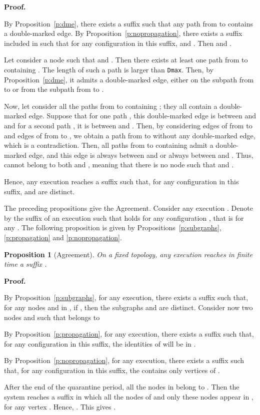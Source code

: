 \documentclass[11pt,english]{article}
\newtheorem{proposition}{Proposition}
\newenvironment{proof}[1][0cm]{
  \begin{list}{\bf Proof.~}{
      \setlength{\itemindent}{0cm}
      \setlength{\labelsep}{0cm}
      \setlength{\labelwidth}{#1}
      \setlength{\leftmargin}{#1}
    \item
    }
}{\hfill
  \end{list}
}
\begin{document}
\begin{proof}
  By Proposition~\ref{p:dme}, there exists a suffix  such that any path
  from  to  contains a double-marked edge. By
  Proposition~\ref{p:nopropagation}, there exists a suffix  included in
   such that for any configuration  in this suffix,  and . Then  and
  .

  Let consider a node  such that  and . Then there
  exists at least one path from  to  containing . The length of such a
  path is larger than \texttt{Dmax}. Then, by Proposition~\ref{p:dme}, it
  admits a double-marked edge, either on the subpath from  to  or from the
  subpath from  to .

  Now, let consider all the paths from  to  containing ; they all
  contain a double-marked edge. Suppose that for one path , this double-marked edge is between  and  and for a second path , it is between
   and . Then, by considering edges of  from  to  and edges of
   from  to , we obtain a path from  to  without any double-marked edge, which is a contradiction. Then, all paths from  to 
  containing  admit a double-marked edge, and this edge is always between 
  and  or always between  and . Thus,  cannot belong to both 
  and , meaning that there is no node  such that  and .

  Hence, any execution reaches a suffix such that, for any configuration  in
  this suffix,  and  are distinct.
\end{proof} 



The preceding propositions give the Agreement.  Consider any execution
.  Denote by  the suffix of an execution
 such that  holds for any configuration ,
that is  for any .
The following proposition is given by Propositions~\ref{p:subgraphs},
\ref{p:propagation} and \ref{p:nopropagation}.

\begin{proposition}[Agreement]\label{p:agree}
  On a fixed topology, any execution  reaches in finite time a suffix
  .
\end{proposition}

\begin{proof}
  By Proposition~\ref{p:subgraphs}, for any execution, there exists a suffix
  such that, for any nodes  and  in , if ,
  then the subgraphs  and  are distinct. Consider now two nodes 
  and  such that  belongs to 

  By Proposition~\ref{p:propagation}, for any execution, there exists a suffix
  such that, for any configuration  in this suffix, the identities of 
  will be in .

  By Proposition~\ref{p:nopropagation}, for any execution, there exists a suffix
  such that, for any configuration  in this suffix, the 
  contains only vertices of .

  After the end of the quarantine period, all the nodes in 
  belong to .  Then the system reaches a suffix in which all
  the nodes of  and only these nodes appear in , for any
  vertex . Hence, . This gives .
\end{proof}
\end{document}
